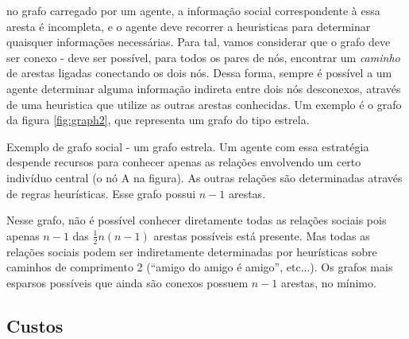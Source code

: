   no grafo carregado por um agente, a informação social correspondente à essa aresta é incompleta, e o agente deve recorrer a heuristicas para determinar quaisquer informações necessárias. Para tal, vamos considerar que o grafo deve ser conexo - deve ser possível, para todos os pares de nós, encontrar um \emph{caminho} de arestas ligadas conectando os dois nós. Dessa forma, sempre é possível a um agente determinar alguma informação indireta entre dois nós desconexos, através de uma heuristica que utilize as outras arestas conhecidas. Um exemplo é o grafo da figura \ref{fig:graph2}, que representa um grafo do tipo estrela. 
  \begin{marginfigure}[-10em]
\caption[Grafo estrela]{Exemplo de grafo social - um grafo estrela. Um agente com essa estratégia despende recursos para conhecer apenas as relações envolvendo um certo indivíduo central (o nó A na figura). As outras relações são determinadas através de regras heurísticas. Esse grafo possui $n-1$ arestas.}
\label{fig:graph2}
\end{marginfigure}
Nesse grafo, não é possível conhecer diretamente todas as relações sociais pois apenas $n-1$ das $\frac{1}{2}n(n-1)$ arestas possíveis está presente. Mas todas as relações sociais podem ser indiretamente determinadas por heurísticas sobre caminhos de comprimento 2 (``amigo do amigo é amigo'', etc...). Os grafos mais esparsos possíveis que ainda são conexos possuem $n-1$ arestas, no mínimo.

\subsection{Custos}

